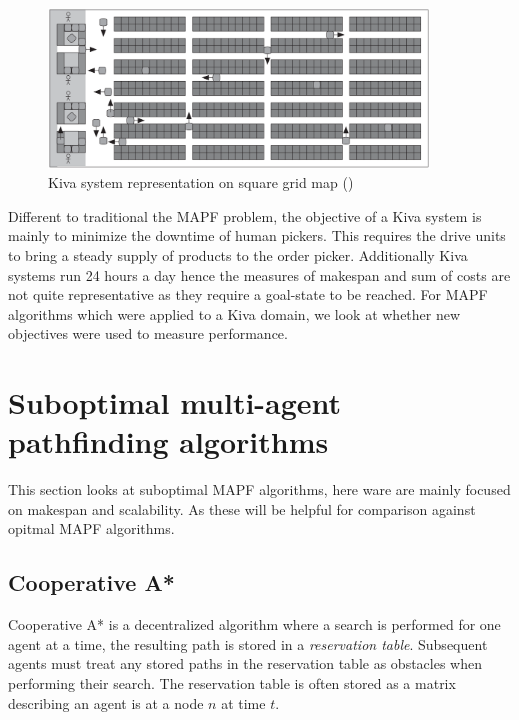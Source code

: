 \documentclass[a4paper,11pt]{article}
\begin{document}
\begin{figure}[h]
	\centering
	\includegraphics[width=0.9\textwidth]{graphics/kivasystemlayout}
	\caption{Kiva system representation on square grid map (\cite{wurman2008coordinating})}
	\label{fig:kivawarehouse}
\end{figure}

Different to traditional the MAPF problem, the objective of a Kiva system is mainly to minimize the downtime of human pickers. This requires the drive units to bring a steady supply of products to the order picker. Additionally Kiva systems run 24 hours a day hence the measures of makespan and sum of costs are not quite representative as they require a goal-state to be reached. For MAPF algorithms which were applied to a Kiva domain, we look at whether new objectives were used to measure performance.

\section{Suboptimal multi-agent pathfinding algorithms} \label{sec:suboptimal}
This section looks at suboptimal MAPF algorithms, here ware are mainly focused on makespan and scalability. As these will be helpful for comparison against opitmal MAPF algorithms.


\subsection{Cooperative A*}
Cooperative A* is a decentralized algorithm where a search is performed for one agent at a time, the resulting path is stored in a \textit{reservation table}. Subsequent agents must treat any stored paths in the reservation table as obstacles when performing their search. The reservation table is often stored as a matrix describing an agent is at a node $n$ at time $t$.
\end{document}
